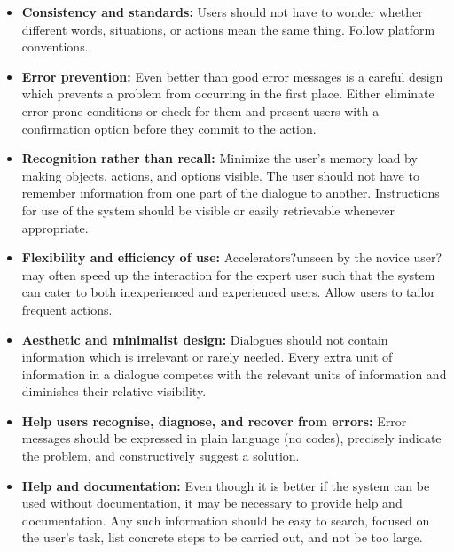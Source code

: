 \begin{frame}		
	\begin{itemize}
		\item \textbf{Consistency and standards:} Users should not have to wonder whether different words, situations, or actions mean the same thing. Follow platform conventions.
		\item \textbf{Error prevention:} Even better than good error messages is a careful design which prevents a problem from occurring in the first place. Either eliminate error-prone conditions or check for them and present users with a confirmation option before they commit to the action.
		\item \textbf{Recognition rather than recall:} Minimize the user's memory load by making objects, actions, and options visible. The user should not have to remember information from one part of the dialogue to another. Instructions for use of the system should be visible or easily retrievable whenever appropriate.
	\end{itemize}	
\end{frame}
					
\begin{frame}		
	\begin{itemize}
		\item \textbf{Flexibility and efficiency of use: } Accelerators?unseen by the novice user?may often speed up the interaction for the expert user such that the system can cater to both inexperienced and experienced users. Allow users to tailor frequent actions.
		\item \textbf{Aesthetic and minimalist design: } Dialogues should not contain information which is irrelevant or rarely needed. Every extra unit of information in a dialogue competes with the relevant units of information and diminishes their relative visibility.
		\item \textbf{Help users recognise, diagnose, and recover from errors: } Error messages should be expressed in plain language (no codes), precisely indicate the problem, and constructively suggest a solution.
	\end{itemize}
\end{frame}		
		
\begin{frame}		
	\begin{itemize}
		\item \textbf{Help and documentation: }Even though it is better if the system can be used without documentation, it may be necessary to provide help and documentation. Any such information should be easy to search, focused on the user's task, list concrete steps to be carried out, and not be too large.
	\end{itemize}
\end{frame}	

